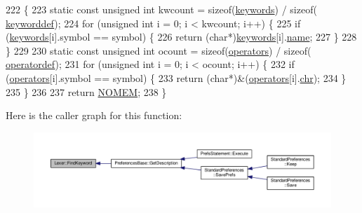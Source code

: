 \begin{DoxyCode}
222 \{
223     \textcolor{keyword}{static} \textcolor{keyword}{const} \textcolor{keywordtype}{unsigned} \textcolor{keywordtype}{int} kwcount = \textcolor{keyword}{sizeof}(\hyperlink{kword_8h_ae24629a120e041e6b687315832fca587}{keywords}) / \textcolor{keyword}{sizeof}(
      \hyperlink{structkeyworddef}{keyworddef});
224     \textcolor{keywordflow}{for} (\textcolor{keywordtype}{unsigned} \textcolor{keywordtype}{int} i = 0; i < kwcount; i++) \{
225         \textcolor{keywordflow}{if} (\hyperlink{kword_8h_ae24629a120e041e6b687315832fca587}{keywords}[i].symbol == symbol) \{
226             \textcolor{keywordflow}{return} (\textcolor{keywordtype}{char}*)\hyperlink{kword_8h_ae24629a120e041e6b687315832fca587}{keywords}[i].\hyperlink{structkeyworddef_a03b3d7dd316565c6fac8786186ec66c2}{name};
227         \}
228     \}
229 
230     \textcolor{keyword}{static} \textcolor{keyword}{const} \textcolor{keywordtype}{unsigned} \textcolor{keywordtype}{int} ocount = \textcolor{keyword}{sizeof}(\hyperlink{lex_8h_aaa2a2d46273713612114ac54f424c653}{operators}) / \textcolor{keyword}{sizeof}(
      \hyperlink{structoperatordef}{operatordef});
231     \textcolor{keywordflow}{for} (\textcolor{keywordtype}{unsigned} \textcolor{keywordtype}{int} i = 0; i < ocount; i++) \{
232         \textcolor{keywordflow}{if} (\hyperlink{lex_8h_aaa2a2d46273713612114ac54f424c653}{operators}[i].symbol == symbol) \{
233             \textcolor{keywordflow}{return} (\textcolor{keywordtype}{char}*)&(\hyperlink{lex_8h_aaa2a2d46273713612114ac54f424c653}{operators}[i].\hyperlink{structoperatordef_afe0e7e99e83e532bf9d616ed75a133c6}{chr});
234         \}
235     \}
236 
237     \textcolor{keywordflow}{return} \hyperlink{platform_8h_a46ff2bfbf0d44b8466a2251d5bd5e6f8}{NOMEM};
238 \}
\end{DoxyCode}


Here is the caller graph for this function\+:\nopagebreak
\begin{figure}[H]
\begin{center}
\leavevmode
\includegraphics[width=350pt]{classLexer_affd4bac61db830383302be71198a372a_icgraph}
\end{center}
\end{figure}


